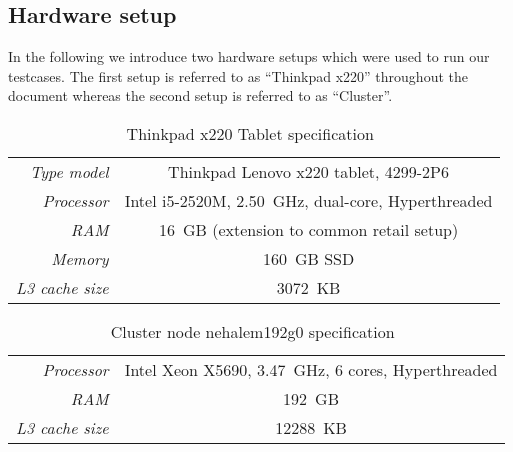 \begin{appendices}
\chapter{Hardware setup}
\label{app:setup}
%
In the following we introduce two hardware setups which were used to run
our testcases. The first setup is referred to as \enquote{Thinkpad x220}
throughout the document whereas the second setup is referred to as
\enquote{Cluster}.

%
\begin{table}[!ht]
  \begin{center}
    \begin{tabular}{rc}
      \hline
      \emph{Type model}     & Thinkpad Lenovo x220 tablet, 4299-2P6 \\
      \emph{Processor}      & Intel i5-2520M, 2.50~GHz, dual-core, Hyperthreaded \\
      \emph{RAM}            & 16~GB (extension to common retail setup)  \\
      \emph{Memory}         & 160~GB SSD \\
      \emph{L3 cache size}  & 3072~KB \\
      \hline
    \end{tabular}
    \caption{Thinkpad x220 Tablet specification~\cite{thinkpadx220}}
    \label{setup:thinkpadx220}
  \end{center}
\end{table}

\begin{table}[!ht]
  \begin{center}
    \begin{tabular}{rc}
      \hline
      \emph{Processor}     & Intel Xeon X5690, 3.47~GHz, 6 cores, Hyperthreaded \\
      \emph{RAM}           & 192~GB \\
      \emph{L3 cache size} & 12288~KB \\
      \hline
    \end{tabular}
    \caption{Cluster node nehalem192g0 specification~\cite{intelX5690}}
    \label{setup:cluster}
  \end{center}
\end{table}

\end{appendices}
